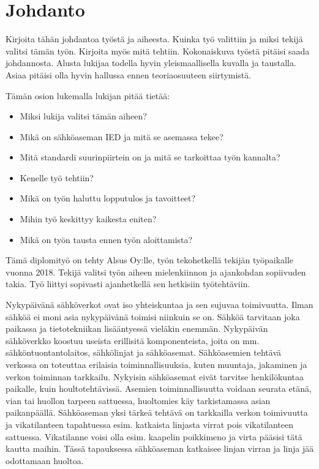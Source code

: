 \chapter{Johdanto}
\label{ch:johdanto}
\begin{it}
	Kirjoita tähän johdantoa työstä ja aiheesta. Kuinka työ valittiin ja miksi tekijä valitsi tämän työn. Kirjoita myös mitä tehtiin. Kokonaiskuva työstä pitäisi saada johdannosta. Alusta lukijaa todella hyvin yleismaallisella kuvalla ja taustalla. Asiaa pitäisi olla hyvin hallussa ennen teoriaosuuteen siirtymistä.
	
	Tämän osion lukemalla lukijan pitää tietää:
	\begin{itemize}
		\item Miksi lukija valitsi tämän aiheen?
		\item Mikä on sähköaseman IED ja mitä se asemassa tekee?
		\item Mitä standardi suurinpiirtein on ja mitä se tarkoittaa työn kannalta?
		\item Kenelle työ tehtiin?
		\item Mikä on työn haluttu lopputulos ja tavoitteet?
		\item Mihin työ keskittyy kaikesta eniten?
		\item Mikä on työn tausta ennen työn aloittamista?
	\end{itemize}
\end{it}

Tämä diplomityö on tehty Alsus Oy:lle, työn tekohetkellä tekijän työpaikalle vuonna 2018. Tekijä valitsi työn aiheen mielenkiinnon ja ajankohdan sopiivuden takia. Työ liittyi sopivasti ajanhetkellä sen hetkisiin työtehtäviin.

Nykypäivänä sähköverkot ovat iso yhteiskuntaa ja sen sujuvaa toimivuutta. Ilman sähköä ei moni asia nykypäivänä toimisi niinkuin se on. Sähköä tarvitaan joka paikassa ja tietotekniikan lisääntyessä vieläkin enemmän. Nykypäivän sähköverkko koostuu useista erillisitä komponenteista, joita on mm. sähköntuontantolaitos, sähkölinjat ja sähköasemat. Sähköasemien tehtävä verkossa on toteuttaa erilaisia toiminnallisuuksia, kuten muuntaja, jakaminen ja verkon toiminnan tarkkailu. Nykyisin sähköasemat eivät tarvitse henkilökuntaa paikalle, kuin houltotehtävissä. Asemien toiminnallisuutta voidaan seurata etänä, vian tai huollon tarpeen sattuessa, huoltomies käy tarkistamassa asian paikanpäällä. Sähköaseman yksi tärkeä tehtävä on tarkkailla verkon toimivuutta ja vikatilanteen tapahtuessa esim. katkaista linjasta virrat pois vikatilanteen sattuessa. Vikatilanne voisi olla esim. kaapelin poikkimeno ja virta pääsisi tätä kautta maihin. Tässä tapauksessa sähköaseman katkaisee linjan virran ja linja jää odottamaan huoltoa.

